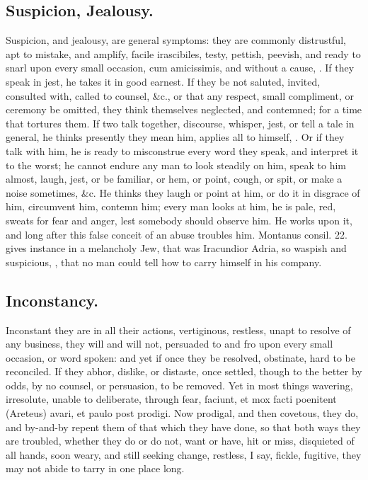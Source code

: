 {\subsection{Suspicion, Jealousy.}
Suspicion, and jealousy, are general symptoms:
they are commonly distrustful, apt to mistake, and amplify, facile
irascibiles, testy, pettish, peevish, and ready to snarl upon
every small occasion, cum amicissimis, and without a cause, . If they speak in jest, he
takes it in good earnest. If they be not saluted, invited, consulted
with, called to counsel, \&c., or that any respect, small compliment, or
ceremony be omitted, they think themselves neglected, and contemned;
for a time that tortures them. If two talk together, discourse,
whisper, jest, or tell a tale in general, he thinks presently they mean
him, applies all to himself, . Or if they talk
with him, he is ready to misconstrue every word they speak, and
interpret it to the worst; he cannot endure any man to look steadily on
him, speak to him almost, laugh, jest, or be familiar, or hem, or
point, cough, or spit, or make a noise sometimes, \&c. He thinks
they laugh or point at him, or do it in disgrace of him, circumvent
him, contemn him; every man looks at him, he is pale, red, sweats for
fear and anger, lest somebody should observe him. He works upon it, and
long after this false conceit of an abuse troubles him. Montanus
consil. 22. gives instance in a melancholy Jew, that was Iracundior
Adria, so waspish and suspicious, , that no man could
tell how to carry himself in his company.

\subsection{Inconstancy.}
Inconstant they are in all their actions, vertiginous,
restless, unapt to resolve of any business, they will and will not,
persuaded to and fro upon every small occasion, or word spoken: and yet
if once they be resolved, obstinate, hard to be reconciled. If they
abhor, dislike, or distaste, once settled, though to the better by
odds, by no counsel, or persuasion, to be removed. Yet in most things
wavering, irresolute, unable to deliberate, through fear, faciunt, et
mox facti poenitent (Areteus) avari, et paulo post prodigi. Now
prodigal, and then covetous, they do, and by-and-by repent them of that
which they have done, so that both ways they are troubled, whether they
do or do not, want or have, hit or miss, disquieted of all hands, soon
weary, and still seeking change, restless, I say, fickle, fugitive,
they may not abide to tarry in one place long.

}
